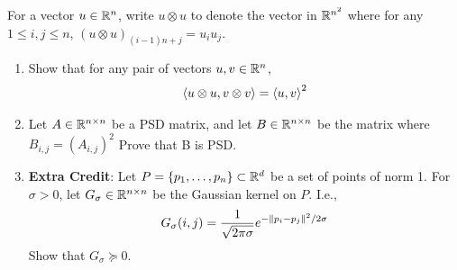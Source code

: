 \documentclass[10pt]{article}
\begin{document}
\begin{problem}[Problem 2]
    For a vector \( u\in\mathbb{R}^n \), write \( u\otimes u \) to denote the vector in \( \mathbb{R}^{n^2} \) where for any \( 1\leq i,j\leq n \), \( (u\otimes u)_{(i-1)n+j} = u_i u_j \).
\begin{enumerate}[label=(\alph*),nolistsep]
    \item Show that for any pair of vectors \( u,v\in\mathbb{R}^n \), 
        \begin{align*}
            \left\langle u\otimes u,v\otimes v \right\rangle = \left\langle u,v \right\rangle^2
        \end{align*}
        
    \item Let \( A \in \mathbb{R}^{n\times n} \) be a PSD matrix, and let \( B \in \mathbb{R}^{n\times n} \) be the matrix where \( B_{i,j} = (A_{i,j})^2 \) Prove that B is PSD.
    \item \textbf{Extra Credit}: Let \( P = \{p_1,\ldots,p_n\} \subset \mathbb{R}^d \) be a set of points of norm 1. For \( \sigma > 0 \), let \( G_\sigma\in \mathbb{R}^{n\times n} \) be the Gaussian kernel on \( P \). I.e.,
        \begin{align*}
            G_\sigma(i,j) = \frac{1}{\sqrt{2\pi \sigma}} e^{-\left\lVert p_i-p_j\right\rVert^2/2\sigma}
        \end{align*}
    Show that \( G_\sigma \succeq 0 \). 
\end{enumerate}
\end{problem}
\end{document}
